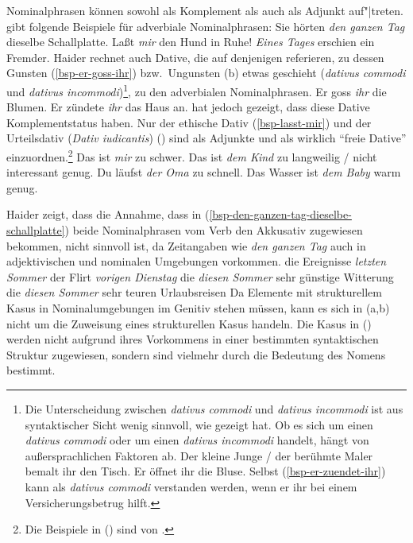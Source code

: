 Nominalphrasen können sowohl als Komplement als auch als Adjunkt
auf"|treten. \citet*{Haider85b} gibt folgende 
Beispiele für adverbiale Nominalphrasen:
\eal
\ex Sie hörten \emph{den ganzen Tag} dieselbe Schallplatte.\label{bsp-den-ganzen-tag-dieselbe-schallplatte}
\ex Laßt \emph{mir} den Hund in Ruhe!\label{bsp-lasst-mir}
\ex \emph{Eines Tages} erschien ein Fremder.
\zl
Haider rechnet auch Dative, die auf denjenigen referieren, zu dessen Gunsten (\ref{bsp-er-goss-ihr})
bzw.\ Ungunsten (b) etwas geschieht (\emph{dativus commodi} und \emph{dativus incommodi})\footnote{\label{fn-dativ-commodi}%
        Die Unterscheidung zwischen \emph{dativus commodi} und \emph{dativus incommodi}
        ist aus syntaktischer Sicht wenig sinnvoll, wie \citet*[]{Wegener85b}
        gezeigt hat.
        Ob es sich um einen \emph{dativus commodi} oder um einen \emph{dativus incommodi} handelt,
        hängt von außersprachlichen Faktoren ab.
        \eal
        \ex Der kleine Junge / der berühmte Maler bemalt ihr den Tisch.
        \ex Er öffnet ihr die Bluse.
        \zl
        Selbst (\ref{bsp-er-zuendet-ihr}) kann als \emph{dativus commodi} verstanden werden, wenn
        er ihr bei einem Versicherungsbetrug hilft.%
}, zu den adverbialen Nominalphrasen.
\eal
\ex Er goss \emph{ihr} die Blumen.\label{bsp-er-goss-ihr}
\ex Er zündete \emph{ihr} das Haus an.\label{bsp-er-zuendet-ihr}
\zl
\citet*{Wegener85b} hat jedoch gezeigt, dass diese Dative Komplementstatus haben.
Nur der ethische Dativ (\ref{bsp-lasst-mir}) und der Urteilsdativ (\emph{Dativ iudicantis}) ()
sind als Adjunkte und als wirklich "`freie Dative"' einzuordnen.\footnote{
        Die Beispiele in () sind von \citet*[]{Wegener85b}.
}
\eal
\ex Das ist \emph{mir} zu schwer.
\ex Das ist \emph{dem Kind} zu langweilig / nicht interessant genug.
\ex Du läufst \emph{der Oma} zu schnell.
\ex Das Wasser ist \emph{dem Baby} warm genug.
\zl

\noindent
Haider zeigt, dass die Annahme, dass in (\ref{bsp-den-ganzen-tag-dieselbe-schallplatte}) beide
Nominalphrasen vom Verb den Akkusativ zugewiesen bekommen,
nicht sinnvoll ist, da Zeitangaben wie \emph{den ganzen Tag} auch in adjektivischen und
nominalen Umgebungen vorkommen.
\eal
\ex die Ereignisse \emph{letzten Sommer}
\ex der Flirt \emph{vorigen Dienstag}
\ex die \emph{diesen Sommer} sehr günstige Witterung
\ex die \emph{diesen Sommer} sehr teuren Urlaubsreisen
\zl
Da Elemente mit strukturellem Kasus in Nominalumgebungen
im Genitiv stehen müssen, kann es sich in (a,b)
nicht um die Zuweisung eines strukturellen Kasus handeln.
%
Die Kasus in () werden nicht aufgrund ihres Vorkommens in einer bestimmten
syntaktischen Struktur zugewiesen, sondern sind vielmehr durch die Bedeutung des Nomens bestimmt.

